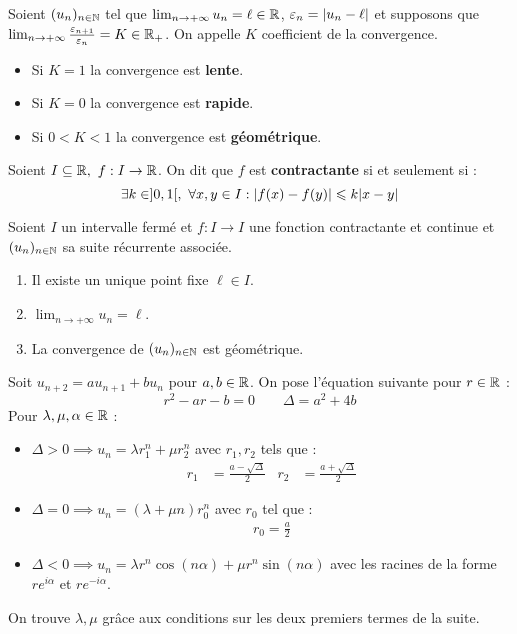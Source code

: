 \begin{definition}
    Soient $(u_n)_{n \in \mathbb{N}}$ tel que $\lim_{n \to +\infty} u_n = \ell \in \mathbb{R}$, $\varepsilon_n = \abs{u_n - \ell}$ et supposons que $\lim_{n \to +\infty} \frac{\varepsilon_{n + 1}}{\varepsilon_n} = K \in \mathbb{R}_+$. 
    On appelle $K$ coefficient de la convergence.
    \begin{itemize}
        \item Si $K = 1$ la convergence est \textbf{lente}.
        \item Si $K = 0$ la convergence est \textbf{rapide}.
        \item Si $0 < K < 1$ la convergence est \textbf{géométrique}.
    \end{itemize}
\end{definition}

\begin{definition}
	Soient $I \subseteq \mathbb{R},\ f : I \to \mathbb{R}$.
    On dit que $f$ est \textbf{contractante} si et seulement si :
    \[ \exists k \in ]0, 1[,\ \forall x, y \in I : \abs{f(x) - f(y)} \leqslant k \abs{x - y} \]
\end{definition}

\begin{theorem}
	Soient $I$ un intervalle fermé et $f : I \to I$ une fonction contractante et continue et $(u_n)_{n \in \mathbb{N}}$ sa suite récurrente associée.
	\begin{enumerate}
        \item Il existe un unique point fixe $\ell \in I$.
        \item $\lim_{n \to +\infty} u_n = \ell$.
        \item La convergence de $(u_n)_{n \in \mathbb{N}}$ est géométrique.
    \end{enumerate}
\end{theorem}

\begin{theorem}
	Soit $u_{n+2} = a u_{n+1} + b u_n$ pour $a, b \in \mathbb{R}$.
	On pose l'équation suivante pour $r \in \mathbb{R}$ :
	\[ r^2 - ar - b = 0 \qquad \Delta = a^2 + 4b \]
	Pour $\lambda, \mu, \alpha \in \mathbb{R}$ :
	\begin{itemize}
        \item $\Delta > 0 \implies u_n = \lambda r_1^n + \mu r_2^n$ avec $r_1, r_2$ tels que :
        \begin{align*}
            r_1 &= \frac{a - \sqrt{\Delta}}{2} & r_2 &= \frac{a + \sqrt{\Delta}}{2}
        \end{align*}
        \item $\Delta = 0 \implies u_n = (\lambda + \mu n) r_0^n$ avec $r_0$ tel que :
        \begin{align*}
            r_0 = \frac{a}{2}
        \end{align*}
        \item $\Delta < 0 \implies u_n = \lambda r^n \cos(n \alpha) + \mu r^n \sin(n \alpha)$ avec les racines de la forme $re^{i\alpha}$ et $re^{-i\alpha}$.
    \end{itemize}    
    On trouve $\lambda, \mu$ grâce aux conditions sur les deux premiers termes de la suite.
\end{theorem}
